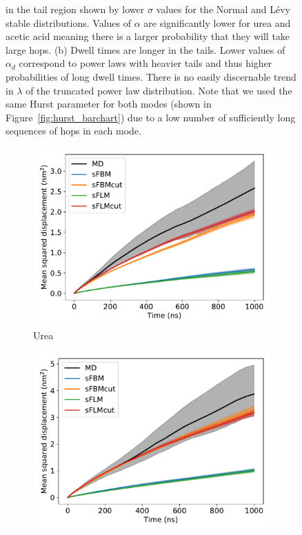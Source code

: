 \documentclass{article}
\begin{document}
\begin{figure}
{  in the tail region shown by lower $\sigma$ values for the Normal and L\'evy stable 
  distributions. Values of $\alpha$ are significantly lower for urea and acetic acid meaning 
  there is a larger probability that they will take large hops. (b) Dwell times are longer in 
  the tails. Lower values of $\alpha_d$ correspond to power laws with heavier tails and 
  thus higher probabilities of long dwell times. There is no easily discernable trend in
  $\lambda$ of the truncated power law distribution. Note that we used the same Hurst parameter
  for both modes (shown in Figure~\ref{fig:hurst_barchart}) due to a low number of 
  sufficiently long sequences of hops in each mode.}
  \label{fig:2mode_parameters}
  \end{figure}  
  
  \begin{figure}
  \centering
  \begin{subfigure}{0.45\textwidth}
  \includegraphics[width=\textwidth]{1mode_msd_comparison_URE.pdf}
  \caption{Urea}\label{fig:1mode_msd_comparison_URE}
  \end{subfigure}
  \begin{subfigure}{0.45\textwidth}
  \includegraphics[width=\textwidth]{1mode_msd_comparison_GCL.pdf}

\end{subfigure}
\end{figure}
\end{document}
